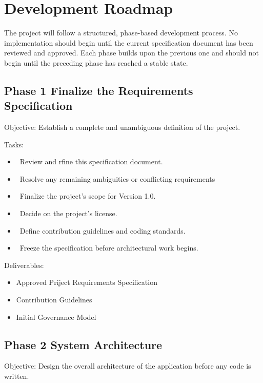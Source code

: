 \chapter{Development Roadmap}

The project will follow a structured, phase-based development process. No implementation should begin until the current specification document has been reviewed and approved. Each phase builds upon the previous one and should not begin until the preceding phase has reached a stable state.

\section{Phase 1 Finalize the Requirements Specification}
Objective: Establish a complete and unambiguous definition of the project.

Tasks:
\begin{itemize}
	\item[] \checkbox\ Review and rfine this specification document.
	\item[] \checkbox\ Resolve any remaining ambiguities or conflicting requirements
	\item[] \checkbox\ Finalize the project's scope for Version 1.0.
	\item[] \checkbox\ Decide on the project's license.
	\item[] \checkbox\ Define contribution guidelines and coding standards.
	\item[] \checkbox\ Freeze the specification before architectural work begins.

\end{itemize}

Deliverables:
\begin{itemize}
	\item Approved Priject Requirements Specification
	\item Contribution Guidelines
	\item Initial Governance Model
\end{itemize}
\section{Phase 2 System Architecture}
Objective: Design the overall architecture of the application before any code is written.

